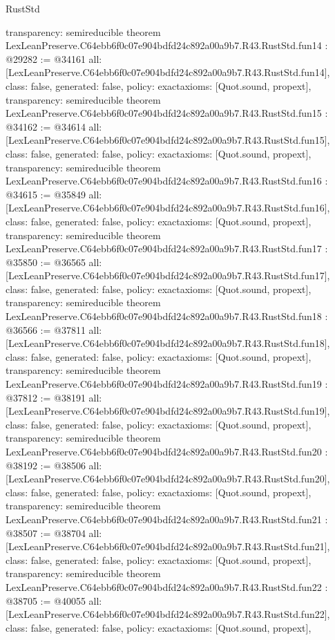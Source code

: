 \begin{lexlean}{RustStd}
\begin{coremodule}
{  transparency: semireducible
}
theorem LexLeanPreserve.C64ebb6f0c07e904bdfd24c892a00a9b7.R43.RustStd.fun14 : @29282 := @34161 {
  all: [LexLeanPreserve.C64ebb6f0c07e904bdfd24c892a00a9b7.R43.RustStd.fun14],
  class: false,
  generated: false,
  policy: exact{axioms: [Quot.sound, propext]},
  transparency: semireducible
}
theorem LexLeanPreserve.C64ebb6f0c07e904bdfd24c892a00a9b7.R43.RustStd.fun15 : @34162 := @34614 {
  all: [LexLeanPreserve.C64ebb6f0c07e904bdfd24c892a00a9b7.R43.RustStd.fun15],
  class: false,
  generated: false,
  policy: exact{axioms: [Quot.sound, propext]},
  transparency: semireducible
}
theorem LexLeanPreserve.C64ebb6f0c07e904bdfd24c892a00a9b7.R43.RustStd.fun16 : @34615 := @35849 {
  all: [LexLeanPreserve.C64ebb6f0c07e904bdfd24c892a00a9b7.R43.RustStd.fun16],
  class: false,
  generated: false,
  policy: exact{axioms: [Quot.sound, propext]},
  transparency: semireducible
}
theorem LexLeanPreserve.C64ebb6f0c07e904bdfd24c892a00a9b7.R43.RustStd.fun17 : @35850 := @36565 {
  all: [LexLeanPreserve.C64ebb6f0c07e904bdfd24c892a00a9b7.R43.RustStd.fun17],
  class: false,
  generated: false,
  policy: exact{axioms: [Quot.sound, propext]},
  transparency: semireducible
}
theorem LexLeanPreserve.C64ebb6f0c07e904bdfd24c892a00a9b7.R43.RustStd.fun18 : @36566 := @37811 {
  all: [LexLeanPreserve.C64ebb6f0c07e904bdfd24c892a00a9b7.R43.RustStd.fun18],
  class: false,
  generated: false,
  policy: exact{axioms: [Quot.sound, propext]},
  transparency: semireducible
}
theorem LexLeanPreserve.C64ebb6f0c07e904bdfd24c892a00a9b7.R43.RustStd.fun19 : @37812 := @38191 {
  all: [LexLeanPreserve.C64ebb6f0c07e904bdfd24c892a00a9b7.R43.RustStd.fun19],
  class: false,
  generated: false,
  policy: exact{axioms: [Quot.sound, propext]},
  transparency: semireducible
}
theorem LexLeanPreserve.C64ebb6f0c07e904bdfd24c892a00a9b7.R43.RustStd.fun20 : @38192 := @38506 {
  all: [LexLeanPreserve.C64ebb6f0c07e904bdfd24c892a00a9b7.R43.RustStd.fun20],
  class: false,
  generated: false,
  policy: exact{axioms: [Quot.sound, propext]},
  transparency: semireducible
}
theorem LexLeanPreserve.C64ebb6f0c07e904bdfd24c892a00a9b7.R43.RustStd.fun21 : @38507 := @38704 {
  all: [LexLeanPreserve.C64ebb6f0c07e904bdfd24c892a00a9b7.R43.RustStd.fun21],
  class: false,
  generated: false,
  policy: exact{axioms: [Quot.sound, propext]},
  transparency: semireducible
}
theorem LexLeanPreserve.C64ebb6f0c07e904bdfd24c892a00a9b7.R43.RustStd.fun22 : @38705 := @40055 {
  all: [LexLeanPreserve.C64ebb6f0c07e904bdfd24c892a00a9b7.R43.RustStd.fun22],
  class: false,
  generated: false,
  policy: exact{axioms: [Quot.sound, propext]},
}
\end{coremodule}
\end{lexlean}
